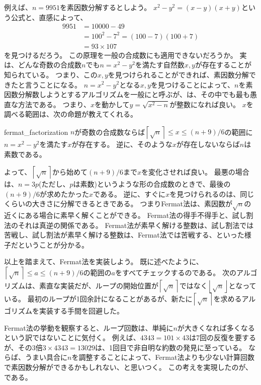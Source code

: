 例えば、$n=9951$を素因数分解するとしよう。
$x^2-y^2 = (x-y)(x+y)$という公式と、直感によって、
\begin{align*}
9951 &= 10000 - 49\\
&= 100^2 - 7^2 = (100 - 7)(100 + 7)\\
&= 93 \times 107
\end{align*}
を見つけるだろう。
この原理を一般の合成数にも適用できないだろうか。
実は、どんな奇数の合成数$n$でも$n=x^2-y^2$を満たす自然数$x,y$が存在することが知られている。
つまり、この$x,y$を見つけられることができれば、素因数分解できたと言うことになる。
$n=x^2-y^2$となる$x,y$を見つけることによって、$n$を素因数分解数しようとするアルゴリズムを一般にと呼ぶが、は、その中でも最も愚直な方法である。
つまり、$x$を動かして$y=\sqrt{x^2-n}$が整数になれば良い。
$x$を調べる範囲は、次の命題が教えてくれる。

\begin{Prop}{}{fermat_factorization}
$n$が奇数の合成数ならば$\left \lceil\sqrt{n}\right \rceil\le x \le (n + 9) / 6$の範囲に$n=x^2-y^2$を満たす$x$が存在する。
逆に、そのような$x$が存在しないならば$n$は素数である。
\end{Prop}

よって、$\left \lceil\sqrt{n}\right \rceil$から始めて$(n + 9) / 6$まで$x$を変化させれば良い。
最悪の場合は、$n=3p$(ただし、$p$は素数)というような形の合成数のときで、最後の$(n + 9) / 6$が求めたかった$x$である。
逆に、すぐに$x$を見つけられるのは、同じくらいの大きさに分解できるときである。
つまりFermat法は、素因数が$\sqrt{n}$の近くにある場合に素早く解くことができる。
Fermat法の得手不得手と、試し割法のそれは真逆の関係である。
Fermat法が素早く解ける整数は、試し割法では苦戦し、試し割法が素早く解ける整数は、Fermat法では苦戦する、といった様子だということが分かる。

以上を踏まえて、Fermat法を実装しよう。
既に述べたように、$\left \lceil\sqrt{n}\right \rceil \le a \le (n + 9) / 6$の範囲の$a$をすべてチェックするのである。
次のアルゴリズムは、素直な実装だが、ループの開始位置が$\left \lceil\sqrt{n}\right \rceil$ではなく$\left \lfloor\sqrt{n}\right \rfloor$となっている。
最初のループが1回余計になることがあるが、新たに$\left \lceil\sqrt{n}\right \rceil$を求めるアルゴリズムを実装する手間を回避した。


Fermat法の挙動を観察すると、ループ回数は、単純に$n$が大きくなれば多くなるという訳ではないことに気付く。
例えば、$4343=101\times43$は7回の反復を要するが、その3倍$3\times4343=13029$は、1回目で非自明な約数の発見に至っている。
ならば、うまい具合に$n$を調整することによって、Fermat法よりも少ない計算回数で素因数分解ができるかもしれない、と思いつく。
この考えを実現したのが、である。

